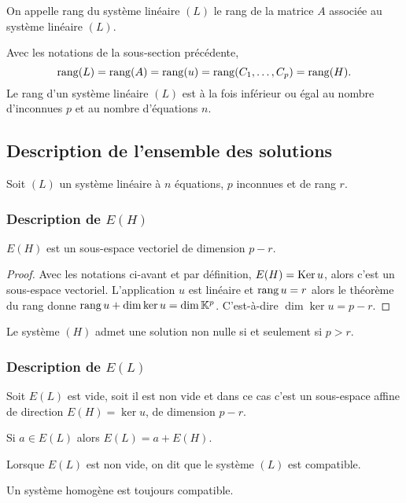 \begin{defdef}
  On appelle rang du système linéaire \((L)\) le rang de la matrice \(A\)
  associée au système linéaire \((L)\).
\end{defdef}
%
\begin{prop}
  Avec les notations de la sous-section précédente,
  \begin{equation}
    \operatorname{rang}(L)=\operatorname{rang}(A)=\operatorname{rang}(u)=\operatorname{rang}(C_1,\ldots,C_p) = \operatorname{rang}(H).
  \end{equation}
  Le rang d'un système linéaire \((L)\) est à la fois inférieur ou égal au
  nombre d'inconnues \(p\) et au nombre d'équations \(n\).
\end{prop}

\subsection{Description de l'ensemble des solutions}

Soit \((L)\) un système linéaire à \(n\) équations, \(p\) inconnues et de rang
\(r\).

\subsubsection{Description de \(E(H)\)}

\begin{theo}
  \(E(H)\) est un sous-espace vectoriel de dimension \(p-r\).
\end{theo}
\begin{proof}
  Avec les notations ci-avant et par définition, \(E(H) = \operatorname{Ker} u\), alors c'est
  un sous-espace vectoriel. L'application \(u\) est linéaire et \(\operatorname{rang} u = r\)
  alors le théorème du rang donne \(\operatorname{rang} u +\dim \ker u = \dim \mathbb{K}^p\).
  C'est-à-dire \(\dim \ker u = p-r\).
\end{proof}
\begin{corth}
  Le système \((H)\) admet une solution non nulle si et seulement si \(p>r\).
\end{corth}

\subsubsection{Description de \(E(L)\)}

\begin{theo}
  Soit \(E(L)\) est vide, soit il est non vide et dans ce cas c'est un
  sous-espace affine de direction \(E(H) = \ker u\), de dimension \(p-r\).

  Si \(a \in E(L)\) alors \(E(L) = a+E(H)\).
\end{theo}
%
\begin{defdef}
  Lorsque \(E(L)\) est non vide, on dit que le système \((L)\) est compatible.
\end{defdef}
%
Un système homogène est toujours compatible.
%
